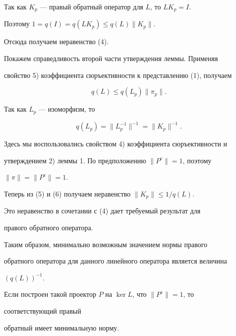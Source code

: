 \begin{pf} 


Так как $K_p$ --- правый обратный оператор для $L$, то $L K_p=I$. 


Поэтому $1=q(I)=q(L K_p)\le q(L)\|K_p\|$. 


Отсюда получаем неравенство (4). 


 


Покажем справедливость второй части утверждения леммы. Применяя  


свойство 5) коэффициента сюръективности к представлению (1), получаем 


\begin{equation} 


q(L)\le q(L_p)\|\pi_p\|. 


\end{equation} 


Так как $L_p$ --- изоморфизм, то 


\begin{equation} 


q(L_p)=\|L^{-1}_p\|^{-1}=\|K_p\|^{-1}. 


\end{equation} 


Здесь мы воспользовались свойством 4) коэффициента сюръективности и  


утверждением 2) леммы 1. По предположению $\|P^c\|=1$, поэтому 


$\|\pi\|=\|P^c\|=1$. 


Теперь из (5) и (6) получаем неравенство $\|K_p\|\le1/q(L)$. 


Это неравенство в сочетании с (4) дает требуемый результат для 


правого обратного оператора. 


\end{pf} 


 


Таким образом, минимально возможным значением нормы правого  


обратного оператора для данного линейного оператора является величина 


$(q(L))^{-1}$. 


Если построен такой проектор $P$ на $\ker L$, что $\|P^c\|=1$, то 


соответствующий правый  


обратный имеет минимальную норму. 


 


